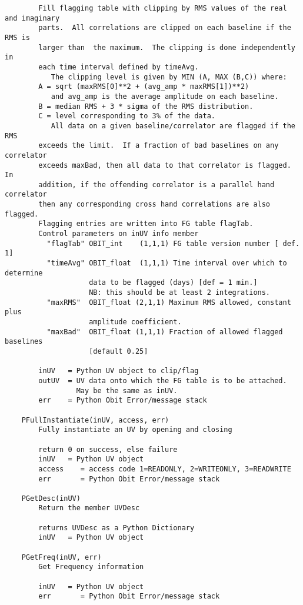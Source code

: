 \documentclass[11pt]{report}
\begin{document}
\begin{verbatim}
        Fill flagging table with clipping by RMS values of the real and imaginary
        parts.  All correlations are clipped on each baseline if the RMS is
        larger than  the maximum.  The clipping is done independently in
        each time interval defined by timeAvg. 
           The clipping level is given by MIN (A, MAX (B,C)) where:
        A = sqrt (maxRMS[0]**2 + (avg_amp * maxRMS[1])**2)
           and avg_amp is the average amplitude on each baseline.
        B = median RMS + 3 * sigma of the RMS distribution.
        C = level corresponding to 3% of the data.
           All data on a given baseline/correlator are flagged if the RMS
        exceeds the limit.  If a fraction of bad baselines on any correlator
        exceeds maxBad, then all data to that correlator is flagged.  In
        addition, if the offending correlator is a parallel hand correlator
        then any corresponding cross hand correlations are also flagged.
        Flagging entries are written into FG table flagTab.
        Control parameters on inUV info member
          "flagTab" OBIT_int    (1,1,1) FG table version number [ def. 1]
          "timeAvg" OBIT_float  (1,1,1) Time interval over which to determine 
                    data to be flagged (days) [def = 1 min.]
                    NB: this should be at least 2 integrations.
          "maxRMS"  OBIT_float (2,1,1) Maximum RMS allowed, constant plus 
                    amplitude coefficient. 
          "maxBad"  OBIT_float (1,1,1) Fraction of allowed flagged baselines 
                    [default 0.25]
        
        inUV   = Python UV object to clip/flag
        outUV  = UV data onto which the FG table is to be attached.
                 May be the same as inUV.
        err    = Python Obit Error/message stack
    
    PFullInstantiate(inUV, access, err)
        Fully instantiate an UV by opening and closing
        
        return 0 on success, else failure
        inUV   = Python UV object
        access    = access code 1=READONLY, 2=WRITEONLY, 3=READWRITE
        err       = Python Obit Error/message stack
    
    PGetDesc(inUV)
        Return the member UVDesc
        
        returns UVDesc as a Python Dictionary
        inUV   = Python UV object
    
    PGetFreq(inUV, err)
        Get Frequency information
        
        inUV   = Python UV object
        err       = Python Obit Error/message stack
    

\end{verbatim}
\end{document}
